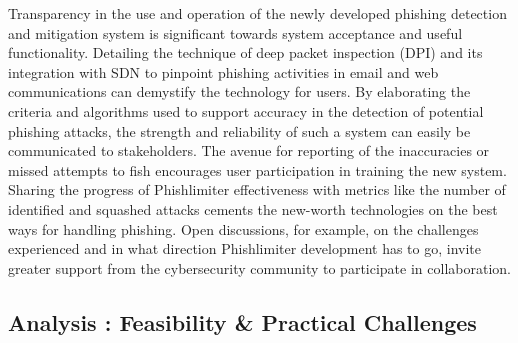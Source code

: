 \begin{itemize}
Transparency in the use and operation of the newly developed phishing detection and mitigation system is significant towards system acceptance and useful functionality. Detailing the technique of deep packet inspection (DPI) and its integration with SDN to pinpoint phishing activities in email and web communications can demystify the technology for users. By elaborating the criteria and algorithms used to support accuracy in the detection of potential phishing attacks, the strength and reliability of such a system can easily be communicated to stakeholders. The avenue for reporting of the inaccuracies or missed attempts to fish encourages user participation in training the new system. Sharing the progress of Phishlimiter effectiveness with metrics like the number of identified and squashed attacks cements the new-worth technologies on the best ways for handling phishing. Open discussions, for example, on the challenges experienced and in what direction Phishlimiter development has to go, invite greater support from the cybersecurity community to participate in collaboration.

\end{itemize}

\subsection{ Analysis : Feasibility \& Practical Challenges }

